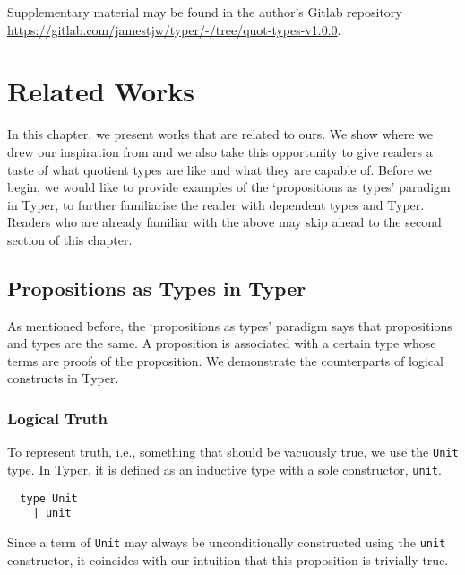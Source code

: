 \documentclass[12pt,twoside,maitrise]{dms}
\theoremstyle{definition}
\numberwithin{equation}{section}
\numberwithin{table}{chapter}
\numberwithin{figure}{chapter}
\newcommand\id[1] {\texttt{#1}}
\begin{document}
Supplementary material may be found in the author's Gitlab repository
\url{https://gitlab.com/jamestjw/typer/-/tree/quot-types-v1.0.0}.


\chapter{Related Works}

In this chapter, we present works that are related to ours. We show where we
drew our inspiration from and we also take this opportunity to give readers a
taste of what quotient types are like and what they are capable of. Before we
begin, we would like to provide examples of the `propositions as types'
paradigm in Typer, to further familiarise the reader with
dependent types and Typer. Readers who are already familiar with the above may
skip ahead to the second section of this chapter.

\section{Propositions as Types in Typer}\label{sec:props-as-types-typer}

As mentioned before, the `propositions as types' paradigm says that
propositions and types are the same. A proposition is associated with a certain
type whose terms are proofs of the proposition. We demonstrate the counterparts
of logical constructs in Typer.

\subsection*{Logical Truth}

To represent truth, i.e., something that should be vacuously true, we use the
\id{Unit} type. In Typer, it is defined as an inductive type with a sole
constructor, \id{unit}.

\begin{verbatim}
  type Unit
    | unit
\end{verbatim}

Since a term of \id{Unit} may always be unconditionally constructed using the
\id{unit} constructor, it coincides with our intuition that this proposition is
trivially true.
\end{document}
